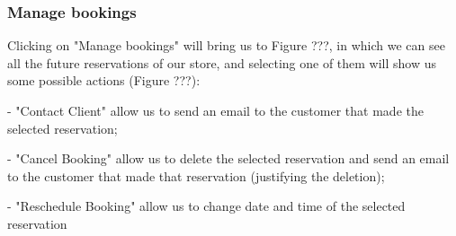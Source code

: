 \documentclass{article}
\begin{document}
		\subsubsection{Manage bookings}
		
		Clicking on "Manage bookings" will bring us to Figure ???, in which we can see all the future reservations of our store, and selecting one of them will show us some possible actions (Figure ???):
		
			- "Contact Client" allow us to send an email to the customer that made the selected reservation;
			
			- "Cancel Booking" allow us to delete the selected reservation and send an email to the customer that made that reservation (justifying the deletion);
			
			- "Reschedule Booking" allow us to change date and time of the selected reservation
			
\end{document}

